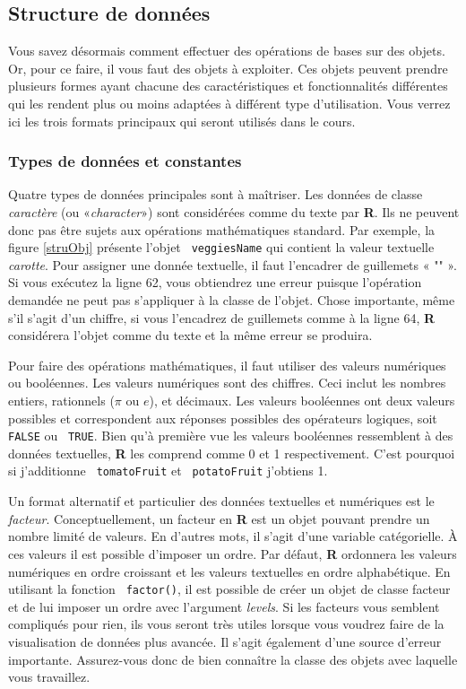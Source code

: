 \documentclass[10.5pt,a4paper]{article}
\newcommand{\rcode}[1]{\texttt{\color{rstudio} #1}}
\begin{document}
  \subsection{Structure de données}
  Vous savez désormais comment effectuer des opérations de bases sur des objets. Or, pour ce faire, il vous faut des objets à exploiter. Ces objets peuvent prendre plusieurs formes ayant chacune des caractéristiques et fonctionnalités différentes qui les rendent plus ou moins adaptées à différent type d'utilisation. Vous verrez ici les trois formats principaux qui seront utilisés dans le cours. 
  
    \subsubsection{Types de données et constantes}
    Quatre types de données principales sont à maîtriser. Les données de classe \emph{caractère} (ou «\emph{character}») sont considérées comme du texte par \textbf{R}. Ils ne peuvent donc pas être sujets aux opérations mathématiques standard. Par exemple, la figure \ref{struObj} présente l'objet \rcode{veggiesName} qui contient la valeur textuelle \emph{carotte}. Pour assigner une donnée textuelle, il faut l'encadrer de guillemets « "" ». Si vous exécutez la ligne 62, vous obtiendrez une erreur puisque l'opération demandée ne peut pas s'appliquer à la classe de l'objet. Chose importante, même s'il s'agit d'un chiffre, si vous l'encadrez de guillemets comme à la ligne 64, \textbf{R} considérera l'objet comme du texte et la même erreur se produira. 
    
    Pour faire des opérations mathématiques, il faut utiliser des valeurs numériques ou booléennes. Les valeurs numériques sont des chiffres. Ceci inclut les nombres entiers, rationnels ($\pi$ ou $e$), et décimaux. Les valeurs booléennes ont deux valeurs possibles et correspondent aux réponses possibles des opérateurs logiques, soit \rcode{FALSE} ou \rcode{TRUE}. Bien qu'à première vue les valeurs booléennes ressemblent à des données textuelles, \textbf{R} les comprend comme 0 et 1 respectivement. C'est pourquoi si j'additionne \rcode{tomatoFruit} et \rcode{potatoFruit} j'obtiens 1.
    
    Un format alternatif et particulier des données textuelles et numériques est le \emph{facteur}. Conceptuellement, un facteur en \textbf{R} est un objet pouvant prendre un nombre limité de valeurs. En d'autres mots, il s'agit d'une variable catégorielle. À ces valeurs il est possible d'imposer un ordre. Par défaut, \textbf{R} ordonnera les valeurs numériques en ordre croissant et les valeurs textuelles en ordre alphabétique. En utilisant la fonction \rcode{factor()}, il est possible de créer un objet de classe facteur et de lui imposer un ordre avec l'argument \emph{levels}. Si les facteurs vous semblent compliqués pour rien, ils vous seront très utiles lorsque vous voudrez faire de la visualisation de données plus avancée. Il s'agit également d'une source d'erreur importante. Assurez-vous donc de bien connaître la classe des objets avec laquelle vous travaillez.
    
\end{document}
